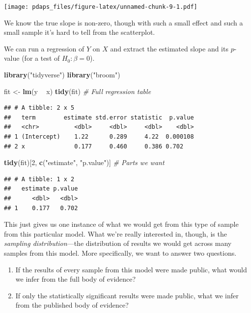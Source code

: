 \documentclass[12pt,oneside,openany]{book}
\newenvironment{Shaded}{\begin{snugshade}}{\end{snugshade}}
\newcommand{\KeywordTok}[1]{\textcolor[rgb]{0.13,0.29,0.53}{\textbf{#1}}}
\newcommand{\DecValTok}[1]{\textcolor[rgb]{0.00,0.00,0.81}{#1}}
\newcommand{\StringTok}[1]{\textcolor[rgb]{0.31,0.60,0.02}{#1}}
\newcommand{\CommentTok}[1]{\textcolor[rgb]{0.56,0.35,0.01}{\textit{#1}}}
\newcommand{\OperatorTok}[1]{\textcolor[rgb]{0.81,0.36,0.00}{\textbf{#1}}}
\newcommand{\NormalTok}[1]{#1}
\begin{document}
\texttt{[image: pdaps\_files/figure-latex/unnamed-chunk-9-1.pdf]}

We know the true slope is non-zero, though with such a small effect and
such a small sample it's hard to tell from the scatterplot.

We can run a regression of \(Y\) on \(X\) and extract the estimated
slope and its \(p\)-value (for a test of \(H_0 : \beta = 0\)).

\begin{Shaded}
\begin{Highlighting}[]
\KeywordTok{library}\NormalTok{(}\StringTok{"tidyverse"}\NormalTok{)}
\KeywordTok{library}\NormalTok{(}\StringTok{"broom"}\NormalTok{)}

\NormalTok{fit <-}\StringTok{ }\KeywordTok{lm}\NormalTok{(y }\OperatorTok{~}\StringTok{ }\NormalTok{x)}
\KeywordTok{tidy}\NormalTok{(fit)  }\CommentTok{# Full regression table}
\end{Highlighting}
\end{Shaded}

\begin{verbatim}
## # A tibble: 2 x 5
##   term        estimate std.error statistic  p.value
##   <chr>          <dbl>     <dbl>     <dbl>    <dbl>
## 1 (Intercept)    1.22      0.289     4.22  0.000108
## 2 x              0.177     0.460     0.386 0.702
\end{verbatim}

\begin{Shaded}
\begin{Highlighting}[]
\KeywordTok{tidy}\NormalTok{(fit)[}\DecValTok{2}\NormalTok{, }\KeywordTok{c}\NormalTok{(}\StringTok{"estimate"}\NormalTok{, }\StringTok{"p.value"}\NormalTok{)]  }\CommentTok{# Parts we want}
\end{Highlighting}
\end{Shaded}

\begin{verbatim}
## # A tibble: 1 x 2
##   estimate p.value
##      <dbl>   <dbl>
## 1    0.177   0.702
\end{verbatim}

This just gives us one instance of what we would get from this type of
sample from this particular model. What we're really interested in,
though, is the \emph{sampling distribution}---the distribution of
results we would get across many samples from this model. More
specifically, we want to answer two questions.

\begin{enumerate}
\def\labelenumi{\arabic{enumi}.}
\item
  If the results of every sample from this model were made public, what
  would we infer from the full body of evidence?
\item
  If only the statistically significant results were made public, what
  we infer from the published body of evidence?
\end{enumerate}
\end{document}
